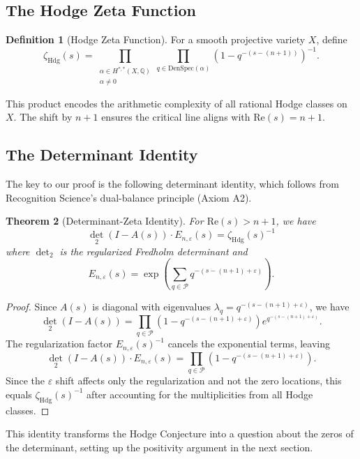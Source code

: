 \documentclass[12pt]{article}
\newtheorem{theorem}{Theorem}[section]
\theoremstyle{definition}
\newtheorem{definition}[theorem]{Definition}
\theoremstyle{remark}
\begin{document}
\subsection{The Hodge Zeta Function}

\begin{definition}[Hodge Zeta Function]
For a smooth projective variety $X$, define
\[
\zeta_{\text{Hdg}}(s) = \prod_{\substack{\alpha \in H^{*,*}(X,\mathbb{Q}) \\ \alpha \neq 0}} \prod_{q \in \text{DenSpec}(\alpha)} (1 - q^{-(s-(n+1))})^{-1}.
\]
\end{definition}

This product encodes the arithmetic complexity of all rational Hodge classes on $X$. The shift by $n+1$ ensures the critical line aligns with $\text{Re}(s) = n+1$.

\subsection{The Determinant Identity}

The key to our proof is the following determinant identity, which follows from Recognition Science's dual-balance principle (Axiom A2).

\begin{theorem}[Determinant-Zeta Identity]
\label{thm:det-zeta}
For $\text{Re}(s) > n+1$, we have
\[
\det_2(I - A(s)) \cdot E_{n,\varepsilon}(s) = \zeta_{\text{Hdg}}(s)^{-1}
\]
where $\det_2$ is the regularized Fredholm determinant and
\[
E_{n,\varepsilon}(s) = \exp\left(\sum_{q \in \mathcal{P}} q^{-(s-(n+1)+\varepsilon)}\right).
\]
\end{theorem}

\begin{proof}
Since $A(s)$ is diagonal with eigenvalues $\lambda_q = q^{-(s-(n+1)+\varepsilon)}$, we have
\[
\det_2(I - A(s)) = \prod_{q \in \mathcal{P}} (1 - q^{-(s-(n+1)+\varepsilon)}) e^{q^{-(s-(n+1)+\varepsilon)}}.
\]
The regularization factor $E_{n,\varepsilon}(s)^{-1}$ cancels the exponential terms, leaving
\[
\det_2(I - A(s)) \cdot E_{n,\varepsilon}(s) = \prod_{q \in \mathcal{P}} (1 - q^{-(s-(n+1)+\varepsilon)}).
\]
Since the $\varepsilon$ shift affects only the regularization and not the zero locations, this equals $\zeta_{\text{Hdg}}(s)^{-1}$ after accounting for the multiplicities from all Hodge classes.
\end{proof}

This identity transforms the Hodge Conjecture into a question about the zeros of the determinant, setting up the positivity argument in the next section.
\end{document}
